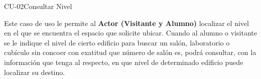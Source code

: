 \begin{UseCase}{CU-02}{Consultar Nivel}
    {
	Este caso de uso le permite al \textbf{Actor (Visitante y Alumno)} localizar el nivel en el que se encuentra el espacio que solicite ubicar. Cuando al alumno o visitante se le indique el nivel de cierto edificio para buscar un salón, laboratorio o cubículo sin concoer con exatitud que número de salón es, podrá consultar, con la información que tenga al respecto, en que nivel de determinado edificio puede localizar su destino. 

	
    }


%			


\end{UseCase}
